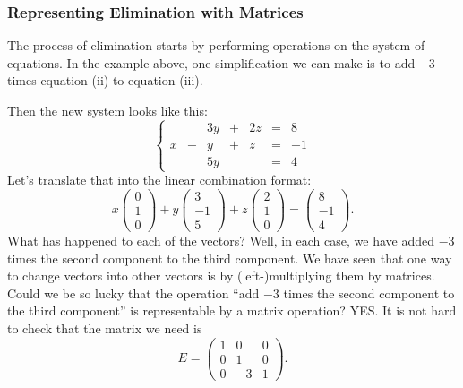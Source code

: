 \documentclass[10pt,]{book}
\theoremstyle{plain}
\numberwithin{equation}{section}
\begin{document}
\subsubsection[Representing Elimination with Matrices]{Representing Elimination with Matrices}\label{subsubsection-14}

        The process of elimination starts by performing operations on the
        system of equations. In the example above, one simplification we can
        make is to add \(-3\) times equation (ii) to equation (iii).
\par

        Then the new system looks like this:
        \[
          \left\{ \begin{array}{rrrrrrr}
          &  &3y &+ &2z &= &8 \\
          x &- & y &+ & z &= &-1 \\
          &  &5y &  &   &= &4
          \end{array}\right.
        \]
        Let's translate that into the linear combination format:
        \[
          x \begin{pmatrix} 0 \\ 1 \\ 0 \end{pmatrix} +
          y \begin{pmatrix} 3 \\ -1 \\ 5 \end{pmatrix} +
          z \begin{pmatrix} 2 \\ 1 \\ 0 \end{pmatrix} =
          \begin{pmatrix} 8 \\ -1 \\ 4 \end{pmatrix} .
        \]
        What has happened to each of the vectors? Well, in each case, we have
        added \(-3\) times the second component to the third component.
        We have seen that one way to change vectors into other vectors is by
        (left-)multiplying them by matrices. Could we be so lucky that the
        operation ``add \(-3\) times the second component to the third
        component'' is representable by a matrix operation? YES. It is not
        hard to check that the matrix we need is
        \[
          E = \begin{pmatrix} 1 &0 &0 \\ 0 &1 &0 \\ 0 &-3 &1 \end{pmatrix} .
        \]
\end{document}
